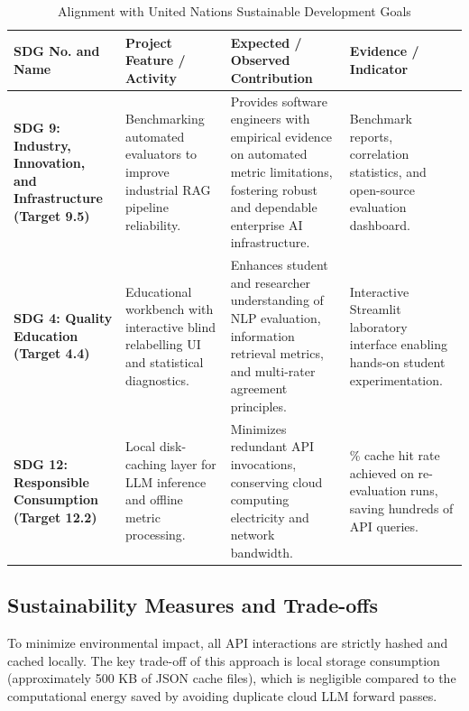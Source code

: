 \documentclass[11pt,a4paper]{article}
\renewcommand{\arraystretch}{1.2}
\begin{document}
\begin{table}[htbp]
\centering
\caption{Alignment with United Nations Sustainable Development Goals}
\label{tab:sdg_alignment}
\footnotesize
\renewcommand{\arraystretch}{1.25}
\begin{tabularx}{\linewidth}{|>{\RaggedRight\bfseries}p{3.0cm}|>{\RaggedRight}X|>{\RaggedRight}X|>{\RaggedRight}p{3.6cm}|}
\hline
\rowcolor{tableheader}
SDG No. and Name & Project Feature / Activity & Expected / Observed Contribution & Evidence / Indicator \\
\hline
\textbf{SDG 9: Industry, Innovation, and Infrastructure} \newline (Target 9.5) & Benchmarking automated evaluators to improve industrial RAG pipeline reliability. & Provides software engineers with empirical evidence on automated metric limitations, fostering robust and dependable enterprise AI infrastructure. & Benchmark reports, correlation statistics, and open-source evaluation dashboard. \\
\hline
\textbf{SDG 4: Quality Education} \newline (Target 4.4) & Educational workbench with interactive blind relabelling UI and statistical diagnostics. & Enhances student and researcher understanding of NLP evaluation, information retrieval metrics, and multi-rater agreement principles. & Interactive Streamlit laboratory interface enabling hands-on student experimentation. \\
\hline
\textbf{SDG 12: Responsible Consumption} \newline (Target 12.2) & Local disk-caching layer for LLM inference and offline metric processing. & Minimizes redundant API invocations, conserving cloud computing electricity and network bandwidth. & 100\% cache hit rate achieved on re-evaluation runs, saving hundreds of API queries. \\
\hline
\end{tabularx}
\end{table}

\subsection{Sustainability Measures and Trade-offs}
To minimize environmental impact, all API interactions are strictly hashed and cached locally. The key trade-off of this approach is local storage consumption (approximately 500 KB of JSON cache files), which is negligible compared to the computational energy saved by avoiding duplicate cloud LLM forward passes.
\end{document}
